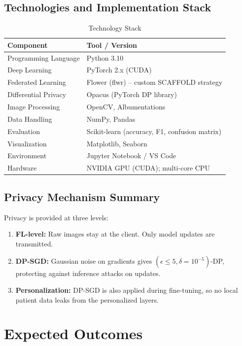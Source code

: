 \documentclass[12pt, a4paper]{article}
\begin{document}
\subsection{Technologies and Implementation Stack}

\begin{table}[H]
\centering
\caption{Technology Stack}
\begin{tabular}{ll}
\toprule
\textbf{Component} & \textbf{Tool / Version} \\
\midrule
Programming Language & Python 3.10 \\
Deep Learning & PyTorch 2.x (CUDA) \\
Federated Learning & Flower (flwr) -- custom SCAFFOLD strategy \\
Differential Privacy & Opacus (PyTorch DP library) \\
Image Processing & OpenCV, Albumentations \\
Data Handling & NumPy, Pandas \\
Evaluation & Scikit-learn (accuracy, F1, confusion matrix) \\
Visualization & Matplotlib, Seaborn \\
Environment & Jupyter Notebook / VS Code \\
Hardware & NVIDIA GPU (CUDA); multi-core CPU \\
\bottomrule
\end{tabular}
\end{table}

\subsection{Privacy Mechanism Summary}

Privacy is provided at three levels:
\begin{enumerate}
  \item \textbf{FL-level:} Raw images stay at the client. Only model updates are transmitted.
  \item \textbf{DP-SGD:} Gaussian noise on gradients gives $(\epsilon \leq 5, \delta = 10^{-5})$-DP, protecting against inference attacks on updates.
  \item \textbf{Personalization:} DP-SGD is also applied during fine-tuning, so no local patient data leaks from the personalized layers.
\end{enumerate}

\section{Expected Outcomes}
\end{document}

